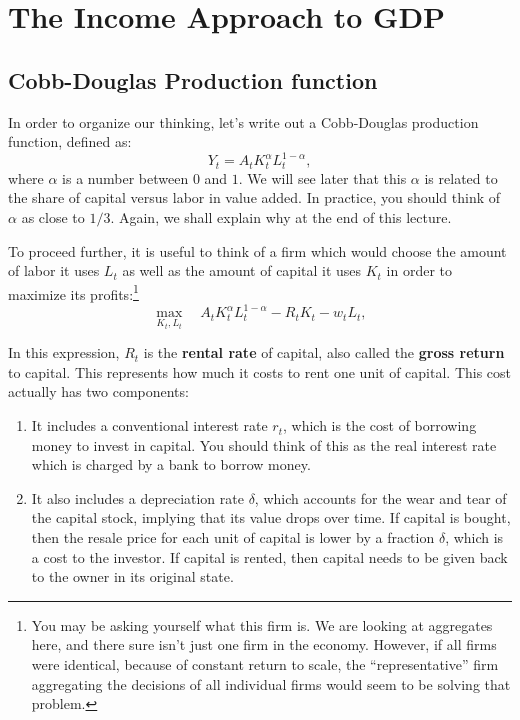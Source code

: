 \documentclass[]{book}
\let\rmarkdownfootnote\footnote%
\def\footnote{\protect\rmarkdownfootnote}
\begin{document}
\section{The Income Approach to GDP}\label{gdp-income}

\subsection{Cobb-Douglas Production
function}\label{cobb-douglas-production-function}

In order to organize our thinking, let's write out a Cobb-Douglas
production function, defined as:
\[Y_t = A_t K_t^{\alpha} L_t^{1-\alpha},\] where \(\alpha\) is a number
between \(0\) and \(1\). We will see later that this \(\alpha\) is
related to the share of capital versus labor in value added. In
practice, you should think of \(\alpha\) as close to \(1/3\). Again, we
shall explain why at the end of this lecture.

To proceed further, it is useful to think of a firm which would choose
the amount of labor it uses \(L_t\) as well as the amount of capital it
uses \(K_t\) in order to maximize its profits:\footnote{You may be
  asking yourself what this firm is. We are looking at aggregates here,
  and there sure isn't just one firm in the economy. However, if all
  firms were identical, because of constant return to scale, the
  ``representative'' firm aggregating the decisions of all individual
  firms would seem to be solving that problem.}
\[\max_{K_t, L_t} \quad A_t K_t^{\alpha} L_t^{1-\alpha} - R_t K_t - w_t L_t,\]

In this expression, \(R_t\) is the \textbf{rental rate} of capital, also
called the \textbf{gross return} to capital. This represents how much it
costs to rent one unit of capital. This cost actually has two
components:

\begin{enumerate}
\def\labelenumi{\arabic{enumi}.}
\item
  It includes a conventional interest rate \(r_t\), which is the cost of
  borrowing money to invest in capital. You should think of this as the
  real interest rate which is charged by a bank to borrow money.
\item
  It also includes a depreciation rate \(\delta\), which accounts for
  the wear and tear of the capital stock, implying that its value drops
  over time. If capital is bought, then the resale price for each unit
  of capital is lower by a fraction \(\delta\), which is a cost to the
  investor. If capital is rented, then capital needs to be given back to
  the owner in its original state.
\end{enumerate}
\end{document}
